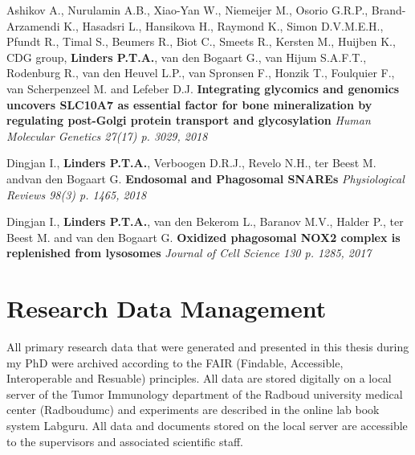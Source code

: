 \vspace{\baselineskip}

\noindent Ashikov A., Nurulamin A.B., Xiao-Yan W., Niemeijer M., Osorio G.R.P., Brand-Arzamendi K., Hasadsri L., Hansikova H., Raymond K., Simon D.V.M.E.H., Pfundt R., Timal S., Beumers R., Biot C., Smeets R., Kersten M., Huijben K., CDG group, \textbf{Linders P.T.A.}, van den Bogaart G., van Hijum S.A.F.T., Rodenburg R., van den Heuvel L.P., van Spronsen F., Honzik T., Foulquier F., van Scherpenzeel M. and Lefeber D.J.\newline
\noindent\textbf{Integrating glycomics and genomics uncovers SLC10A7 as essential factor for bone mineralization by regulating post-Golgi protein transport and glycosylation} \newline
\noindent\emph{Human Molecular Genetics 27(17) p. 3029, 2018}

\clearpage

\noindent Dingjan I., \textbf{Linders P.T.A.}, Verboogen D.R.J., Revelo N.H., ter Beest M. and\newline van den Bogaart G. \newline
\noindent\textbf{Endosomal and Phagosomal SNAREs}\newline
\noindent\emph{Physiological Reviews 98(3) p. 1465, 2018}

\vspace{\baselineskip}

\noindent Dingjan I.,  \textbf{Linders P.T.A.}, van den Bekerom L., Baranov M.V., Halder P., ter Beest M. and van den Bogaart G. \newline
\noindent\textbf{Oxidized phagosomal NOX2 complex is replenished from lysosomes}\newline
\noindent\emph{Journal of Cell Science 130 p. 1285, 2017}

\cleartoleftpage

\section{Research Data Management}
All primary research data that were generated and presented in this thesis during my PhD were archived according to the FAIR (Findable, Accessible, Interoperable and Resuable) principles. All data are stored digitally on a local server of the Tumor Immunology department of the Radboud university medical center (Radboudumc) and experiments are described in the online lab book system Labguru. All data and documents stored on the local server are accessible to the supervisors and associated scientific staff.

